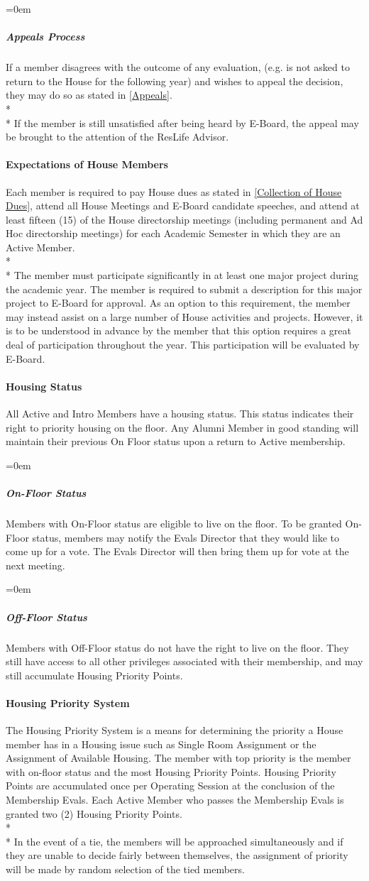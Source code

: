 \documentclass{article}
\newcommand{\asubsubsection}[1]{\paragraph{#1} \label{#1}}
\newcommand{\asubsubsubsection}[1]{\parindent=0em\subparagraph{#1} \label{#1}}
\begin{document}
\asubsubsubsection{Appeals Process}
If a member disagrees with the outcome of any evaluation, (e.g. is not asked to return to the House for the following year) and wishes to appeal the decision, they may do so as stated in \ref{Appeals}.
\\* \\*
If the member is still unsatisfied after being heard by E-Board, the appeal may be brought to the attention of the ResLife Advisor.

\asubsubsection{Expectations of House Members}
Each member is required to pay House dues as stated in \ref{Collection of House Dues}, attend all House Meetings and E-Board candidate speeches, and attend at least fifteen (15) of the House directorship meetings (including permanent and Ad Hoc directorship meetings) for each Academic Semester in which they are an Active Member.
\\* \\*
The member must participate significantly in at least one major project during the academic year.
The member is required to submit a description for this major project to E-Board for approval.
As an option to this requirement, the member may instead assist on a large number of House activities and projects.
However, it is to be understood in advance by the member that this option requires a great deal of participation throughout the year.
This participation will be evaluated by E-Board.

\asubsubsection{Housing Status}
All Active and Intro Members have a housing status.
This status indicates their right to priority housing on the floor.
Any Alumni Member in good standing will maintain their previous On Floor status upon a return to Active membership.

\asubsubsubsection{On-Floor Status}
Members with On-Floor status are eligible to live on the floor.
To be granted On-Floor status, members may notify the Evals Director that they would like to come up for a vote.
The Evals Director will then bring them up for vote at the next meeting.

\asubsubsubsection{Off-Floor Status}
Members with Off-Floor status do not have the right to live on the floor.
They still have access to all other privileges associated with their membership, and may still accumulate Housing Priority Points.

\asubsubsection{Housing Priority System}
The Housing Priority System is a means for determining the priority a House member has in a Housing issue such as Single Room Assignment or the Assignment of Available Housing.
The member with top priority is the member with on-floor status and the most Housing Priority Points.
Housing Priority Points are accumulated once per Operating Session at the conclusion of the Membership Evals. Each Active Member who passes the Membership Evals is granted two (2) Housing Priority Points.
\\* \\*
In the event of a tie, the members will be approached simultaneously and if they are unable to decide fairly between themselves, the assignment of priority will be made by random selection of the tied members.
\end{document}
